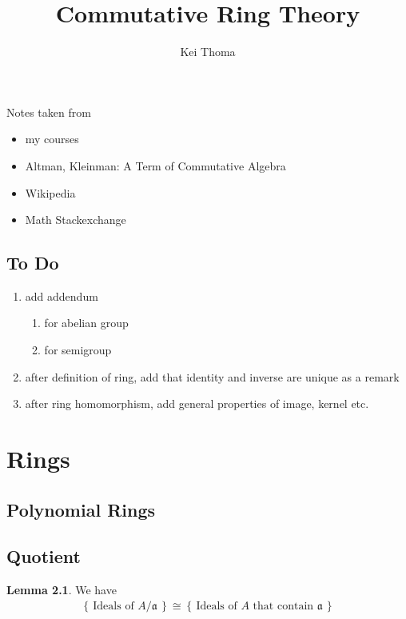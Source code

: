 \documentclass[a4paper]{book}
\title{Commutative Ring Theory}
\author{Kei Thoma}
\theoremstyle{definition}
\newtheorem{lemma}[definition]{Lemma}
\newcommand{\set}[1]{\left\{\, #1 \,\right\}}
\begin{document}
\maketitle
\tableofcontents

\newpage
Notes taken from
\begin{itemize}
    \item my courses
    \item Altman, Kleinman: A Term of Commutative Algebra
    \item Wikipedia
    \item Math Stackexchange
\end{itemize}

\chapter{To Do}
\begin{enumerate}
    \item add addendum
    \begin{enumerate}
        \item for abelian group
        \item for semigroup
    \end{enumerate}
    \item after definition of ring, add that identity and inverse are unique as a remark
    \item after ring homomorphism, add general properties of image, kernel etc.
\end{enumerate}

\part{Rings}



\chapter{Polynomial Rings}

\chapter{Quotient}

\begin{thmbox}
    \begin{lemma}
        We have
        \begin{align*}
            \set{\text{Ideals of } A / \mathfrak{a}} \cong \set{\text{Ideals of } A \text{ that contain } \mathfrak{a}}
        \end{align*}
    \end{lemma}
\end{thmbox}
\end{document}

